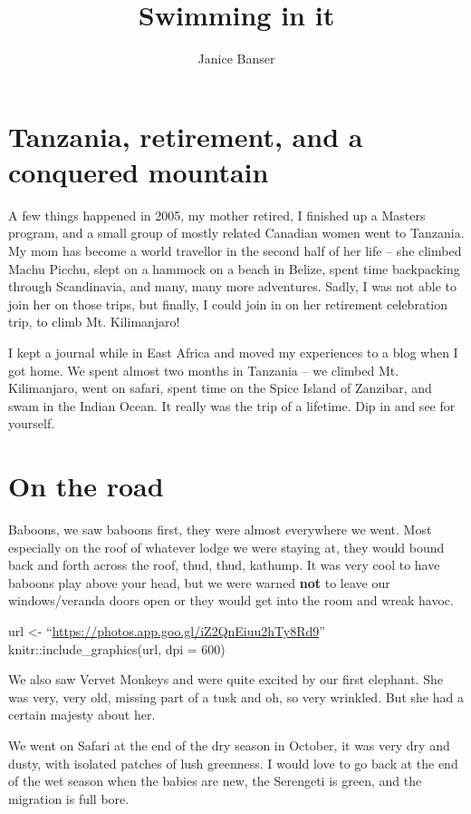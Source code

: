 \documentclass[
  openany]{book}
\title{Swimming in it}
\author{Janice Banser}
\date{}
\begin{document}
\maketitle

{
\setcounter{tocdepth}{1}
\tableofcontents
}
\hypertarget{tanzania-retirement-and-a-conquered-mountain}{%
\chapter{Tanzania, retirement, and a conquered mountain}\label{tanzania-retirement-and-a-conquered-mountain}}

A few things happened in 2005, my mother retired, I finished up a Masters program, and a small group of mostly related Canadian women went to Tanzania. My mom has become a world travellor in the second half of her life -- she climbed Machu Picchu, slept on a hammock on a beach in Belize, spent time backpacking through Scandinavia, and many, many more adventures. Sadly, I was not able to join her on those trips, but finally, I could join in on her retirement celebration trip, to climb Mt. Kilimanjaro!

I kept a journal while in East Africa and moved my experiences to a blog when I got home. We spent almost two months in Tanzania -- we climbed Mt. Kilimanjaro, went on safari, spent time on the Spice Island of Zanzibar, and swam in the Indian Ocean. It really was the trip of a lifetime. Dip in and see for yourself.

\hypertarget{on-the-road}{%
\chapter{On the road}\label{on-the-road}}

Baboons, we saw baboons first, they were almost everywhere we went. Most especially on the roof of whatever lodge we were staying at, they would bound back and forth across the roof, thud, thud, kathump. It was very cool to have baboons play above your head, but we were warned \textbf{not} to leave our windows/veranda doors open or they would get into the room and wreak havoc.

url \textless- ``\url{https://photos.app.goo.gl/iZ2QnEiuu2hTy8Rd9}''
knitr::include\_graphics(url, dpi = 600)

We also saw Vervet Monkeys and were quite excited by our first elephant. She was very, very old, missing part of a tusk and oh, so very wrinkled. But she had a certain majesty about her.

We went on Safari at the end of the dry season in October, it was very dry and dusty, with isolated patches of lush greenness. I would love to go back at the end of the wet season when the babies are new, the Serengeti is green, and the migration is full bore.
\end{document}

